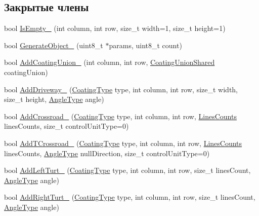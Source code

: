 \subsection*{Закрытые члены}
\begin{DoxyCompactItemize}
\item 
bool \hyperlink{classrtm_1_1_world_controller_adb901be7a42ea77c48eadc1358f89af1}{Is\+Empty\+\_\+} (int column, int row, size\+\_\+t width=1, size\+\_\+t height=1)
\item 
bool \hyperlink{classrtm_1_1_world_controller_a23b126a4227462eb8c6637f105c23614}{Generate\+Object\+\_\+} (uint8\+\_\+t $\ast$params, uint8\+\_\+t count)
\item 
bool \hyperlink{classrtm_1_1_world_controller_a6639efb9bada52ca44f485482e7b0e70}{Add\+Coating\+Union\+\_\+} (int column, int row, \hyperlink{namespacertm_a0b1daa4ff7c2591d8433d441f9e56e4c}{Coating\+Union\+Shared} coating\+Union)
\item 
bool \hyperlink{classrtm_1_1_world_controller_ae1ed62925357166038cde39adab53171}{Add\+Driveway\+\_\+} (\hyperlink{namespacertm_aecd3929e64cd461eb3555b611f6fad95}{Coating\+Type} type, int column, int row, size\+\_\+t width, size\+\_\+t height, \hyperlink{namespacertm_a69dc82b16a0148c10962caa83d930f89}{Angle\+Type} angle)
\item 
bool \hyperlink{classrtm_1_1_world_controller_a044376120aaed246dcb1e15b7ca345ac}{Add\+Crossroad\+\_\+} (\hyperlink{namespacertm_aecd3929e64cd461eb3555b611f6fad95}{Coating\+Type} type, int column, int row, \hyperlink{namespacertm_a14457f3088a92b86a96686b72d3e4eea}{Lines\+Counts} lines\+Counts, size\+\_\+t control\+Unit\+Type=0)
\item 
bool \hyperlink{classrtm_1_1_world_controller_aa691a505a1a3c18c98974ab5a3aac5ca}{Add\+T\+Crossroad\+\_\+} (\hyperlink{namespacertm_aecd3929e64cd461eb3555b611f6fad95}{Coating\+Type} type, int column, int row, \hyperlink{namespacertm_a14457f3088a92b86a96686b72d3e4eea}{Lines\+Counts} lines\+Counts, \hyperlink{namespacertm_a69dc82b16a0148c10962caa83d930f89}{Angle\+Type} null\+Direction, size\+\_\+t control\+Unit\+Type=0)
\item 
bool \hyperlink{classrtm_1_1_world_controller_a8c74afa75819e11feec4424cc03388f8}{Add\+Left\+Turt\+\_\+} (\hyperlink{namespacertm_aecd3929e64cd461eb3555b611f6fad95}{Coating\+Type} type, int column, int row, size\+\_\+t lines\+Count, \hyperlink{namespacertm_a69dc82b16a0148c10962caa83d930f89}{Angle\+Type} angle)
\item 
bool \hyperlink{classrtm_1_1_world_controller_aa516f5455b1bad2f80e10f13f3060773}{Add\+Right\+Turt\+\_\+} (\hyperlink{namespacertm_aecd3929e64cd461eb3555b611f6fad95}{Coating\+Type} type, int column, int row, size\+\_\+t lines\+Count, \hyperlink{namespacertm_a69dc82b16a0148c10962caa83d930f89}{Angle\+Type} angle)

\end{DoxyCompactItemize}
